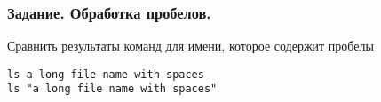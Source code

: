 \begin{frame}[fragile]
	\frametitle{Задание. Обработка пробелов.}
Сравнить результаты команд для имени, которое содержит пробелы
    \begin{lstlisting}
ls a long file name with spaces
ls "a long file name with spaces"
\end{lstlisting}
\end{frame}
